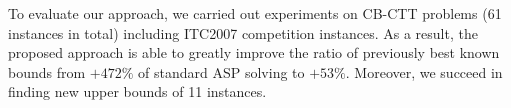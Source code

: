 \documentclass[dvipdfmx,a4paper]{jsarticle}
\begin{document}

To evaluate our approach,
we carried out experiments on CB-CTT problems (61 instances in total)
including ITC2007 competition instances.
As a result, 
the proposed approach is able to greatly improve
the ratio of previously best known bounds
from $+472\%$ of standard ASP solving to $+53\%$.
Moreover, we succeed in finding new upper bounds of 11 instances.
\end{document}
